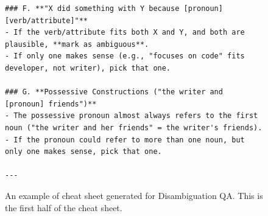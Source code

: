 \begin{figure}[t]
\begin{tcolorbox}[title=Cheat Sheet for Disambiguation QA (1/2), colback=gray!10, colframe=black!70, boxrule=0.5pt, top=0pt, bottom=0pt, left=0pt, right=0pt, arc=0.8mm, width=1.0\textwidth]
\begin{lstlisting}
### F. **"X did something with Y because [pronoun] [verb/attribute]"**
- If the verb/attribute fits both X and Y, and both are plausible, **mark as ambiguous**.
- If only one makes sense (e.g., "focuses on code" fits developer, not writer), pick that one.

### G. **Possessive Constructions ("the writer and [pronoun] friends")**
- The possessive pronoun almost always refers to the first noun ("the writer and her friends" = the writer's friends).
- If the pronoun could refer to more than one noun, but only one makes sense, pick that one.

---
\end{lstlisting}
\end{tcolorbox}
\caption{
An example of cheat sheet generated for Disambiguation QA.
This is the first half of the cheat sheet.
}
\label{fig:cheat_sheet_disamb_1}
\end{figure}